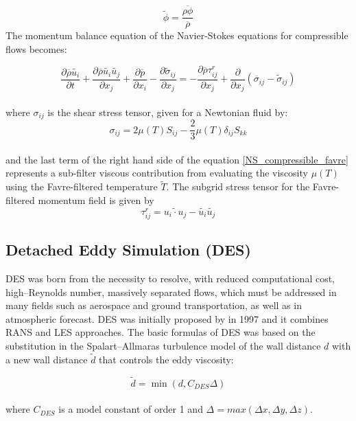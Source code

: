 \documentclass[a5paper]{sapthesis}
\begin{document}
	\begin{equation}
		\tilde {\phi }=\frac {\overline {\rho \phi }}{\overline {\rho }}
	\end{equation}
	The momentum balance equation of the Navier-Stokes equations for compressible flows becomes:
	
	\begin{equation}
		{\frac {\partial {\overline {\rho }}{\tilde {u_{i}}}}{\partial t}}+{\frac {\partial {\overline {\rho }}{\tilde {u_{i}}}{\tilde {u_{j}}}}{\partial x_{j}}}+{\frac {\partial {\overline {p}}}{\partial x_{i}}}-{\frac {\partial {\tilde {\sigma }}_{ij}}{\partial x_{j}}}=-{\frac {\partial {\overline {\rho }}\tau _{ij}^{r}}{\partial x_{j}}}+{\frac {\partial }{\partial x_{j}}}\left({\overline {\sigma }}_{ij}-{\tilde {\sigma }}_{ij}\right)
		\label{NS_compressible_favre}
	\end{equation}
	\\
	where $\sigma _{ij}$ is the shear stress tensor, given for a Newtonian fluid by: 
	\begin{equation}
		\sigma _{ij}=2\mu (T)S_{ij}-{\frac {2}{3}}\mu (T)\delta _{ij}S_{kk}
	\end{equation}
	\\
	and the last term of the right hand side of the equation \ref{NS_compressible_favre} represents a sub-filter viscous contribution from evaluating the viscosity $\mu (T)$ using the Favre-filtered temperature $\tilde {T}$. The subgrid stress tensor for the Favre-filtered momentum field is given by 
	\begin{equation}
			\tau _{ij}^{r}={\widetilde {u_{i}\cdot u_{j}}}-{\tilde {u_{i}}}{\tilde {u_{j}}}
	\end{equation}
	\subsection{Detached Eddy Simulation (DES)}
	DES was born from the necessity to resolve, with reduced computational cost, high–Reynolds number, massively separated flows, which must be addressed in many fields such as aerospace and ground transportation, as well as in
	atmospheric forecast.
	DES was initially proposed by \citet{DES} in 1997 and it combines RANS and LES approaches. The basic formulas of DES was based on the substitution in the Spalart–Allmaras turbulence model of the wall distance $d$ with a new wall distance $\tilde{d}$ that controls the eddy viscosity:
	
	\begin{equation}
		\tilde{d} = \min(d, C_{DES}\Delta)
	\end{equation}
	\\
	where $C_{DES}$ is a model constant of order 1 and $\Delta = max(\Delta x, \Delta y, \Delta z)$.
	
\end{document}
